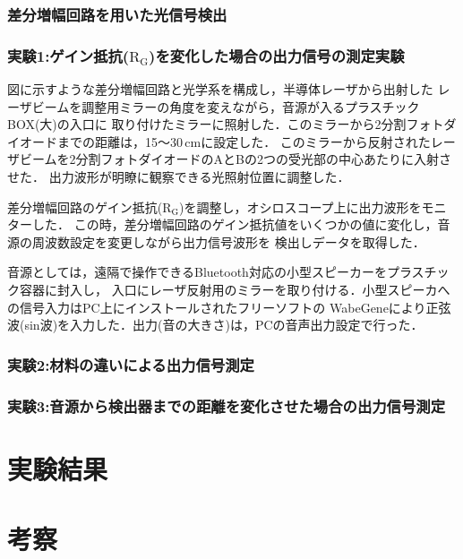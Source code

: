 \documentclass{ltjsarticle}
\begin{document}
		\subsubsection{差分増幅回路を用いた光信号検出}
			\subsubsection{実験1:ゲイン抵抗($\mathrm{R_G}$)を変化した場合の出力信号の測定実験}
				
				図に示すような差分増幅回路と光学系を構成し，半導体レーザから出射した
				レーザビームを調整用ミラーの角度を変えながら，音源が入るプラスチックBOX(大)の入口に
				取り付けたミラーに照射した．このミラーから2分割フォトダイオードまでの距離は，15～30\,cmに設定した．
				このミラーから反射されたレーザビームを2分割フォトダイオードのAとBの2つの受光部の中心あたりに入射させた．
				出力波形が明瞭に観察できる光照射位置に調整した．

				差分増幅回路のゲイン抵抗($\mathrm{R_G}$)を調整し，オシロスコープ上に出力波形をモニターした．
				この時，差分増幅回路のゲイン抵抗値をいくつかの値に変化し，音源の周波数設定を変更しながら出力信号波形を
				検出しデータを取得した．

				音源としては，遠隔で操作できるBluetooth対応の小型スピーカーをプラスチック容器に封入し，
				入口にレーザ反射用のミラーを取り付ける．小型スピーカへの信号入力はPC上にインストールされたフリーソフトの
				WabeGeneにより正弦波(sin波)を入力した．出力(音の大きさ)は，PCの音声出力設定で行った．
			\subsubsection{実験2:材料の違いによる出力信号測定}
			\subsubsection{実験3:音源から検出器までの距離を変化させた場合の出力信号測定}
\section{実験結果}
\section{考察}
\begin{thebibliography}{99}

\end{thebibliography}
\end{document}
